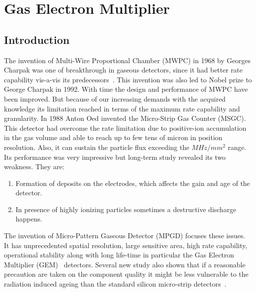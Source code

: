 \chapter{Gas Electron Multiplier} %
\label{cha:gas_electron_multiplier}

\section{Introduction} %
\label{sec:introduction}
The invention of Multi-Wire Proportional Chamber (MWPC) in 1968 by Georges Charpak was one of breakthrough in gaseous detectors, since it had better rate capability vis-a-vis its predecessors~\cite{Charpak1968}. 
This invention was also led to Nobel prize to George Charpak in 1992. With time the design and performance of MWPC have been improved. But because of our increasing demands with the acquired knowledge its limitation reached in terms of the maximum rate capability and granularity. In 1988 Anton Oed invented the Micro-Strip Gas Counter (MSGC). 
This detector had overcome the rate limitation due to positive-ion accumulation in the gas volume and able to reach up to few tens of micron in position resolution. 
Also, it can sustain the particle flux exceeding the $MHz/mm^2$ range. Its performance was very impressive but long-term study revealed its two weakness. They are:
\begin{enumerate}
	\item Formation of deposits on the electrodes, which affects the gain and age of the detector.
	\item In presence of highly ionizing particles sometimes a destructive discharge happens.
\end{enumerate}
The invention of Micro-Pattern Gaseous Detector (MPGD) focuses these issues. 
It has unprecedented spatial resolution, large sensitive area, high rate capability, operational stability along with long life-time in particular the Gas Electron Multiplier (GEM)~\cite{Sauli1997,Sauli1999,detector:1732870} detectors. 
Several new study also shown that if a reasonable precaution are taken on the component quality it might be less vulnerable to the radiation induced ageing than the standard silicon micro-strip detectors~\cite{TITOV2004,Titov2002}.

